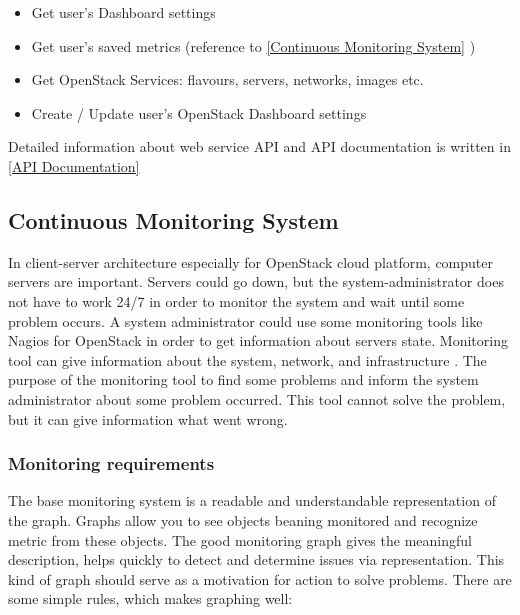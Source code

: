 \begin{itemize}
\item Get user's Dashboard settings
\item Get user's saved metrics (reference to \autoref{Continuous Monitoring System} )
\item Get OpenStack Services: flavours, servers, networks, images etc.
\item Create / Update user's OpenStack Dashboard settings
\end{itemize}

Detailed information about web service API and API documentation is written in \autoref{API Documentation}


\subsection{Continuous Monitoring System}\label{Continuous Monitoring System}

In client-server architecture especially for OpenStack cloud platform, computer servers are important. Servers could go down, but the system-administrator does not have to work 24/7 in order to monitor the system and wait until some problem occurs. A system administrator could use some monitoring tools like Nagios for OpenStack in order to get information about servers state. Monitoring tool can give information about the system, network, and infrastructure \cite{nagios}. The purpose of the monitoring tool to find some problems and inform the system administrator about some problem occurred. This tool cannot solve the problem, but it can give information what went wrong.
 
\subsubsection{Monitoring requirements}\label{Monitoring requirements}

The base monitoring system is a readable and understandable representation of the graph. Graphs allow you to see objects beaning monitored and recognize metric from these objects. 
The good monitoring graph gives the meaningful description, helps quickly to detect and determine issues via representation. This kind of graph should serve as a motivation for action to solve problems. 
There are some simple rules, which makes graphing well:

